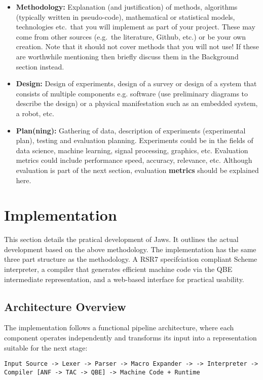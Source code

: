\documentclass[final]{cmpreport_02}
\begin{document}
\begin{itemize}
\item \textbf{Methodology: } Explanation (and justification) of methods, algorithms (typically written in pseudo-code), mathematical or statistical models, technologies etc.\ that you will implement as part of your project. These may come from other sources (e.g.\ the literature, Github, etc.) or be your own creation. Note that it should not cover methods that you will not use! If these are worthwhile mentioning then briefly discuss them in the Background section instead.
\item \textbf{Design: } Design of experiments, design of a survey or design of a system that consists of multiple components e.g. software (use preliminary diagrams to describe the design) or a physical manifestation such as an embedded system, a robot, etc.
\item \textbf{Plan(ning): } Gathering of data, description of experiments (experimental plan), testing and evaluation planning. Experiments could be in the fields of data science, machine learning, signal processing, graphics, etc. Evaluation metrics could include performance speed, accuracy, relevance, etc. Although evaluation is part of the next section, evaluation \textbf{metrics} should be explained here.
\end{itemize}

\section{Implementation}
This section details the pratical development of Jaws. It outlines the actual development based on the above methodology. The implementation has the same three part structure as the methodology. A RSR7 specifciation compliant Scheme interpreter, a compiler that generates efficient machine code via the QBE intermediate representation, and a web-based interface for practical usability.

\subsection{Architecture Overview}
The implementation follows a functional pipeline architecture, where each component operates independently and transforms its input into a representation suitable for the next stage:

\texttt{Input Source -> Lexer -> Parser -> Macro Expander ->
    -> Interpreter
    -> Compiler [ANF -> TAC -> QBE] -> Machine Code + Runtime } 
\end{document}
